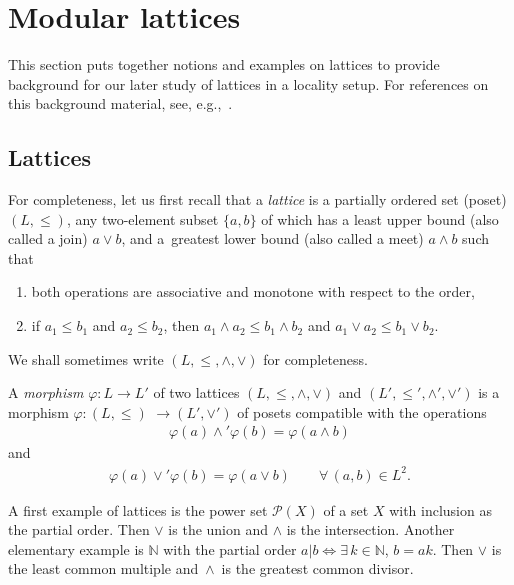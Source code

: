 \documentclass[10pt,a4paper]{amsart}
\numberwithin{equation}{section}
\newcommand{\N}{\mathbb{N}}
\begin{document}
\section {Modular lattices} \label{section:lattices}
{\samepage
This section puts together notions and examples on lattices to provide background
for our later study of lattices in a locality setup. For references on this background material, see, e.g.,~\cite{B,FF, Gra2,Gra1,HP,K,ML,MM,PR}.

}

\subsection{Lattices}
For completeness, let us first recall that a {\it lattice} is a partially ordered set (poset) $(L,\leq)$, any two-element subset $ \{a, b\}$ of which has a
least upper bound (also called a join) $a\vee b$, and a~greatest lower bound (also called a meet) $a\wedge b$ such that
\begin{enumerate}\itemsep=0pt
\item[$(a)$] both operations are associative and monotone with respect to the order,
\item[$(b)$] if $a_1\leq b_1$ and $a_2\leq b_2$, then $a_1\wedge a_2\leq b_1\wedge b_2$ and $a_1\vee a_2\leq b_1\vee b_2$.
\end{enumerate}
We shall sometimes write $(L,\leq,\wedge, \vee)$ for completeness.

A {\it morphism} $\varphi\colon L\to L'$ of two lattices $(L,\leq,\wedge, \vee)$ and $(L',\leq',\wedge', \vee')$ is a morphism $\varphi\colon (L,\leq )$ $\to (L', \vee')$ of posets compatible with the operations
\begin{gather*}
\varphi(a)\wedge'\varphi(b)= \varphi(a\wedge b)
\end{gather*}
and
\begin{gather*}
\varphi(a)\vee'\varphi(b)= \varphi(a\vee b) \qquad \forall\, (a, b)\in L^2.
\end{gather*}

\begin{Example} \label{ex:powerset} %
A first example of lattices is the power set ${\mathcal P}(X)$ of a set $X$ with inclusion as the partial order. Then $\vee$ is the union and $\wedge$ is the intersection. Another elementary example is $\N$ with the partial order $a\vert b\Longleftrightarrow \exists\, k\in \N$, $b=a k$. Then $\vee$ is the least common multiple and~$\wedge$~is the greatest common divisor.
\end{Example}
\end{document}
